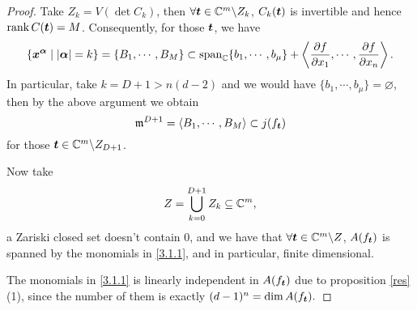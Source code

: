 \begin{proof}
Take $Z_k = V\left( \det C_k \right)$, then $\forall {\boldsymbol t} \in {\mathbb{C}}^m \backslash Z_k$, $C_k({\boldsymbol t})$ is invertible and hence  $\operatorname{rank} C({\boldsymbol t}) = M$. Consequently, for those ${\boldsymbol t}$, we have 
\[\{{\boldsymbol{x}}^{\boldsymbol{\alpha}} \mid |\boldsymbol{\alpha}| = k \} = \{B_1,\cdots, B_M \}\subset  \operatorname{span}_{\mathbb{C}}\{ b_1,\cdots, b_\mu\} + \left\langle \frac{\partial f}{\partial x_1},\cdots, \frac{\partial f}{\partial x_n} \right\rangle.\]
In particular, take $k=D+1>n(d-2)$ and we would have $\{b_1,\cdots,b_\mu\}=\varnothing$, then by the above argument we obtain 
\[\mathfrak m^{D+1}=\left\langle B_1,\cdots, B_M\right\rangle \subset j(f_{\boldsymbol t})\]
for those ${\boldsymbol t}\in {\mathbb{C}}^m \backslash Z_{D+1}$. 

Now take 
\[Z=\bigcup_{k=0}^{D+1} Z_{k}\subseteq {\mathbb{C}}^m,\]
a Zariski closed set doesn't contain $0$, and 
we have that $\forall {\boldsymbol t}\in {\mathbb{C}}^m \backslash Z$, $A(f_{\boldsymbol t})$ is spanned by the monomials in \eqref{3.1.1}, and in particular, finite dimensional.  

The monomials in \eqref{3.1.1} is linearly independent in $A(f_{\boldsymbol t})$ due to  proposition \ref{res} (1),  since the number of them is exactly $(d-1)^n=\dim A(f_{\boldsymbol t}).$
\end{proof}

